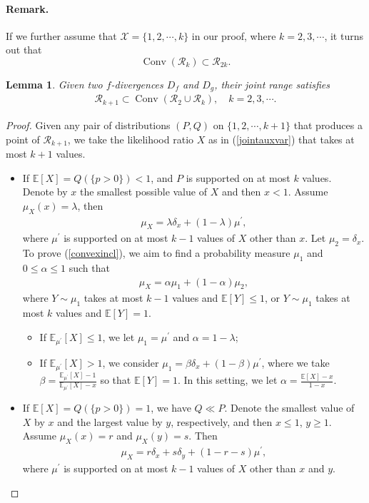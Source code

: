 \documentclass{article}
\numberwithin{equation}{section}
\newcommand{\E}{\mathbb{E}}
\renewcommand{\cal}{\mathcal}
\DeclareMathOperator{\conv}{Conv}
\theoremstyle{plain}
\newtheorem{lemma}[theorem]{Lemma}
\theoremstyle{definition}
\begin{document}
\paragraph{Remark.} If we further assume that $\cal{X}=\{1,2,\cdots,k\}$ in our proof, where $k=2,3,\cdots$, it turns out that $$\conv(\cal{R}_k)\subset\cal{R}_{2k}.$$

\newpage
\begin{lemma}\label{jointauxiter}
	Given two $f$-divergences $D_f$ and $D_g$, their joint range satisfies
	\begin{align}
		\cal{R}_{k+1}\subset\conv(\cal{R}_2\cup\cal{R}_k),\quad k=2,3,\cdots.\label{convexincl}
	\end{align}
\end{lemma}
\begin{proof}
Given any pair of distributions $(P,Q)$ on $\{1,2,\cdots,k+1\}$ that produces a point of $\cal{R}_{k+1}$, we take the likelihood ratio $X$ as in (\ref{jointauxvar}) that takes at most $k+1$ values.
\begin{itemize}
\item If $\E[X]=Q(\{p>0\})<1$, and $P$ is supported on at most $k$ values. Denote by $x$ the smallest possible value of $X$ and then $x<1$. Assume $\mu_X(x)=\lambda$, then
\begin{align*}
	\mu_X=\lambda\delta_x+(1-\lambda)\mu^\prime,
\end{align*}
where $\mu^\prime$ is supported on at most $k-1$ values of $X$ other than $x$. Let $\mu_2=\delta_x$. To prove (\ref{convexincl}), we aim to find a probability measure $\mu_1$ and $0\leq\alpha\leq 1$ such that
\begin{align*}
	\mu_X=\alpha\mu_1+(1-\alpha)\mu_2,
\end{align*}
where $Y\sim\mu_1$ takes at most $k-1$ values and $\E[Y]\leq 1$, or $Y\sim\mu_1$ takes at most $k$ values and $\E[Y]= 1$.
\begin{itemize}
	\item If $\E_{\mu^\prime}[X]\leq 1$, we let $\mu_1=\mu^\prime$ and $\alpha=1-\lambda$;
	\item If $\E_{\mu^\prime}[X]> 1$, we consider $\mu_1=\beta\delta_x+(1-\beta)\mu^\prime$, where we take $\beta=\frac{\E_{\mu^\prime}[X]-1}{\E_{\mu^\prime}[X]-x}$ so that $\E[Y]=1$. In this setting, we let $\alpha=\frac{\E[X]-x}{1-x}$.
\end{itemize}
\item If $\E[X]=Q(\{p>0\})=1$, we have $Q\ll P$. Denote the smallest value of $X$ by $x$ and the largest value by $y$, respectively, and
then $x\leq 1$, $y\geq 1$. Assume $\mu_X(x)=r$ and $\mu_X(y)=s$. Then
\begin{align*}
	\mu_X=r\delta_x+s\delta_y+(1-r-s)\mu^\prime,
\end{align*}
where $\mu^\prime$ is supported on at most $k-1$ values of $X$ other than $x$ and $y$. 


\end{itemize}
\end{proof}
\end{document}
